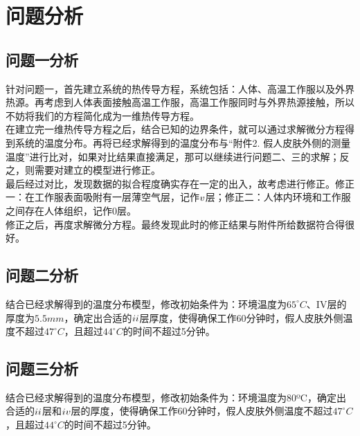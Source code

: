 \documentclass[bwprint]{cumcmthesis}
\begin{document}
\newpage
\section{问题分析}
    \subsection{问题一分析}
        \indent 针对问题一，首先建立系统的热传导方程，系统包括：人体、高温工作服以及外界热源。再考虑到人体表面接触高温工作服，高温工作服同时与外界热源接触，所以不妨将我们的方程简化成为一维热传导方程。\\
        \indent 在建立完一维热传导方程之后，结合已知的边界条件，就可以通过求解微分方程得到系统的温度分布。再将已经求解得到的温度分布与“附件2. 假人皮肤外侧的测量温度”进行比对，如果对比结果直接满足，那可以继续进行问题二、三的求解；反之，则需要对建立的模型进行修正。\\
        \indent 最后经过对比，发现数据的拟合程度确实存在一定的出入，故考虑进行修正。修正一：在工作服表面吸附有一层薄空气层，记作$\uppercase\expandafter{\romannumeral5}$层；修正二：人体内环境和工作服之间存在人体组织，记作0层。\\
        \indent 修正之后，再度求解微分方程。最终发现此时的修正结果与附件所给数据符合得很好。
    \subsection{问题二分析}
        \indent 结合已经求解得到的温度分布模型，修改初始条件为：环境温度为$65^{\circ}C$、IV层的厚度为$5.5mm$，确定出合适的$\uppercase\expandafter{\romannumeral2}$层厚度，使得确保工作60分钟时，假人皮肤外侧温度不超过$47^{\circ}C$，且超过$44^{\circ}C$的时间不超过5分钟。
    \subsection{问题三分析}
        \indent 结合已经求解得到的温度分布模型，修改初始条件为：环境温度为80ºC，确定出合适的$\uppercase\expandafter{\romannumeral2}$层和$\uppercase\expandafter{\romannumeral4}$层的厚度，使得确保工作60分钟时，假人皮肤外侧温度不超过$47^{\circ}C$，且超过$44^{\circ}C$的时间不超过5分钟。

\newpage
\end{document}

